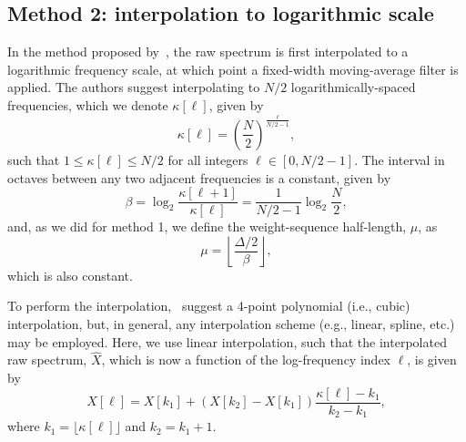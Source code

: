 \subsection{Method 2: interpolation to logarithmic scale} \label{sec:A3_Smoothing_Weights:Smoothing_Methods:Lipshitz_Method}
In the method proposed by~\citet{Lipshitz1985}, the raw spectrum is first interpolated to a logarithmic frequency scale, at which point a fixed-width moving-average filter is applied.
The authors suggest interpolating to $N/2$ logarithmically-spaced frequencies, which we denote $\kappa[\ell]$, given by
\begin{equation}
\kappa[\ell] = \left( \frac{N}{2} \right)^\frac{\ell}{N/2-1},
\end{equation}
such that $1 \leq \kappa[\ell] \leq N/2$ for all integers $\ell \in [0, N/2 - 1]$.
The interval in octaves between any two adjacent frequencies is a constant, given by
\begin{equation}
\beta = \log_2 \frac{\kappa[\ell + 1]}{\kappa[\ell]} = \frac{1}{N/2-1} \log_2 \frac{N}{2},
\end{equation}
and, as we did for method 1, we define the weight-sequence half-length, $\mu$, as
\begin{equation}
\mu = \left\lfloor \frac{\Delta/2}{\beta} \right\rfloor,
\end{equation}
which is also constant.

To perform the interpolation,~\citet{Lipshitz1985} suggest a 4-point polynomial (i.e., cubic) interpolation, but, in general, any interpolation scheme (e.g., linear, spline, etc.) may be employed.
Here, we use linear interpolation, such that the interpolated raw spectrum, $\hat{X}$, which is now a function of the log-frequency index $\ell$, is given by
\begin{equation}\label{eq:A3_Smoothing_Weights:LogInterpolate}
\hat{X}[\ell] = X[k_1] + \left( X[k_2] - X[k_1] \right) \frac{\kappa[\ell] - k_1}{k_2 - k_1},
\end{equation}
where $k_1 = \big\lfloor \kappa[\ell] \big\rfloor$ and $k_2 = k_1 + 1$.


